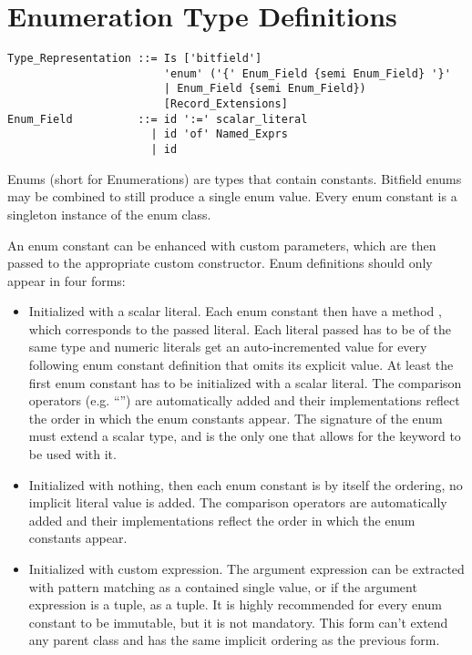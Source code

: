 






\section{Enumeration Type Definitions}
\label{sec:enums}

\syntax\begin{lstlisting}
Type_Representation ::= Is ['bitfield'] 
                        'enum' ('{' Enum_Field {semi Enum_Field} '}'
                        | Enum_Field {semi Enum_Field})
                        [Record_Extensions]
Enum_Field          ::= id ':=' scalar_literal
                      | id 'of' Named_Exprs
                      | id
\end{lstlisting}

Enums (short for Enumerations) are types that contain constants. Bitfield enums may be combined to still produce a single enum value. Every enum constant is a singleton instance of the enum class. 

An enum constant can be enhanced with custom parameters, which are then passed to the appropriate custom constructor. Enum definitions should only appear in four forms: 
\begin{itemize}
  \item Initialized with a scalar literal. Each enum constant then have a method , which corresponds to the passed literal. Each literal passed has to be of the same type and numeric literals get an auto-incremented value for every following enum constant definition that omits its explicit value. At least the first enum constant has to be initialized with a scalar literal. The comparison operators (e.g. ``\code{<}'') are automatically added and their implementations reflect the order in which the enum constants appear. The signature of the enum must extend a scalar type, and is the only one that allows for the  keyword to be used with it.
  \item Initialized with nothing, then each enum constant is by itself the ordering, no implicit literal value is added. The comparison operators are automatically added and their implementations reflect the order in which the enum constants appear. 
  \item Initialized with custom expression. The argument expression can be extracted with pattern matching as a contained single value, or if the argument expression is a tuple, as a tuple. It is highly recommended for every enum constant to be immutable, but it is not mandatory. This form can't extend any parent class and has the same implicit ordering as the previous form. 
\end{itemize}

